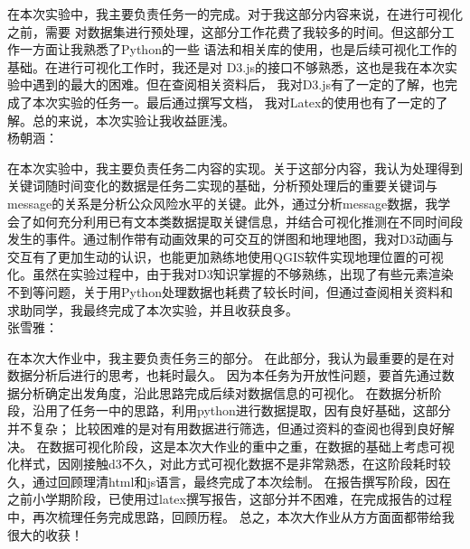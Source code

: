 \documentclass[a4paper]{article}
\begin{document}
在本次实验中，我主要负责任务一的完成。对于我这部分内容来说，在进行可视化之前，需要
对数据集进行预处理，这部分工作花费了我较多的时间。但这部分工作一方面让我熟悉了Python的一些
语法和相关库的使用，也是后续可视化工作的基础。在进行可视化工作时，我还是对
D3.js的接口不够熟悉，这也是我在本次实验中遇到的最大的困难。但在查阅相关资料后，
我对D3.js有了一定的了解，也完成了本次实验的任务一。最后通过撰写文档，
我对Latex的使用也有了一定的了解。总的来说，本次实验让我收益匪浅。
\\

杨朝涵：

在本次实验中，我主要负责任务二内容的实现。关于这部分内容，我认为处理得到关键词随时间变化的数据是任务二实现的基础，分析预处理后的重要关键词与message的关系是分析公众风险水平的关键。此外，通过分析message数据，我学会了如何充分利用已有文本类数据提取关键信息，并结合可视化推测在不同时间段发生的事件。通过制作带有动画效果的可交互的饼图和地理地图，我对D3动画与交互有了更加生动的认识，也能更加熟练地使用QGIS软件实现地理位置的可视化。虽然在实验过程中，由于我对D3知识掌握的不够熟练，出现了有些元素渲染不到等问题，关于用Python处理数据也耗费了较长时间，但通过查阅相关资料和求助同学，我最终完成了本次实验，并且收获良多。
\\

张雪雅：

在本次大作业中，我主要负责任务三的部分。
在此部分，我认为最重要的是在对数据分析后进行的思考，也耗时最久。
因为本任务为开放性问题，要首先通过数据分析确定出发角度，沿此思路完成后续对数据信息的可视化。
在数据分析阶段，沿用了任务一中的思路，利用python进行数据提取，因有良好基础，这部分并不复杂；
比较困难的是对有用数据进行筛选，但通过资料的查阅也得到良好解决。
在数据可视化阶段，这是本次大作业的重中之重，在数据的基础上考虑可视化样式，因刚接触d3不久，对此方式可视化数据不是非常熟悉，在这阶段耗时较久，通过回顾理清html和js语言，最终完成了本次绘制。
在报告撰写阶段，因在之前小学期阶段，已使用过latex撰写报告，这部分并不困难，在完成报告的过程中，再次梳理任务完成思路，回顾历程。
总之，本次大作业从方方面面都带给我很大的收获！

\newpage

\end{document}
